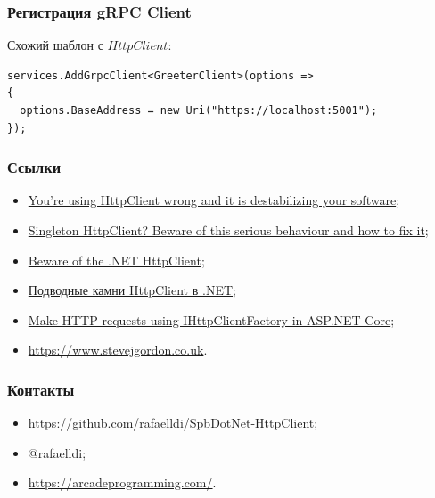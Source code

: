 \documentclass[17pt,aspectratio=169]{beamer}
\begin{document}
\begin{frame}[fragile]
\frametitle{Регистрация gRPC Client}
Схожий шаблон с $HttpClient$:
\newline
\begin{lstlisting}
services.AddGrpcClient<GreeterClient>(options =>
{
  options.BaseAddress = new Uri("https://localhost:5001");
});
\end{lstlisting}
\end{frame}

\begin{frame}
\frametitle{Ссылки}
\begin{itemize}
	\item \href{https://aspnetmonsters.com/2016/08/2016-08-27-httpclientwrong/}{You're using HttpClient wrong and it is destabilizing your software};
	\item \href{https://byterot.blogspot.com/2016/07/singleton-httpclient-dns.html}{Singleton HttpClient? Beware of this serious behaviour and how to fix it};
	\item \href{https://nima-ara-blog.azurewebsites.net/beware-of-the-net-httpclient/}{Beware of the .NET HttpClient};
	\item \href{https://habr.com/en/post/424873/}{Подводные камни HttpClient в .NET};
	\item \href{https://docs.microsoft.com/en-us/aspnet/core/fundamentals/http-requests?view=aspnetcore-2.2}{Make HTTP requests using IHttpClientFactory in ASP.NET Core};
	\item \href{https://www.stevejgordon.co.uk}{https://www.stevejgordon.co.uk}.
\end{itemize}
\end{frame}

\begin{frame}
\frametitle{Контакты}
\begin{itemize}
	\item \href{Слайды и примеры https://github.com/rafaelldi/SpbDotNet-HttpClient}{https://github.com/rafaelldi/SpbDotNet-HttpClient};
	\item @rafaelldi;
	\item \href{https://arcadeprogramming.com/}{https://arcadeprogramming.com/}.
\end{itemize}
\end{frame}
\end{document}
